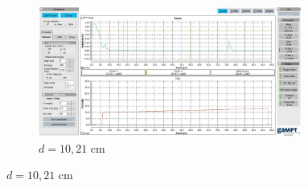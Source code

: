 \begin{figure}
  \begin{subfigure}{0.7\textwidth}
    \centering
    \includegraphics[width=0.95\textwidth]{screens/1021.jpg}
    \caption{$d = 10,21$ cm}
    \label{fig:135-deg}
  \end{subfigure}
  \label{fig: graphen}
\end{figure}


